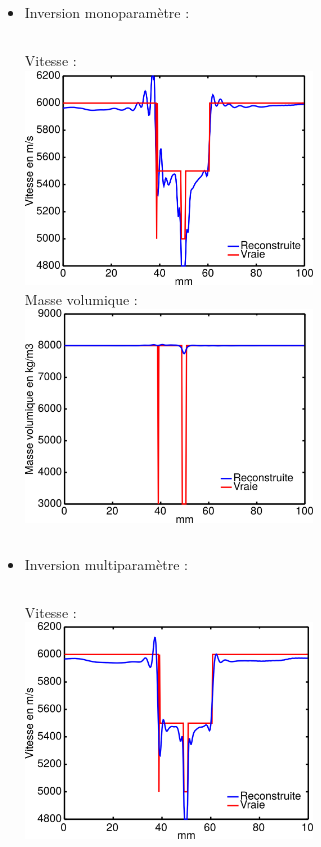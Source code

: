 \documentclass[10pt,xcolor=x11names,compress, notes=show]{beamer}%
\begin{document}
\subsection*{}
\begin{frame}{\insertsectionhead}
\begin{small}
\begin{itemize}
	\item Inversion monoparamètre : \\[0.2cm]
	\begin{columns}
		\centering
		Vitesse : \\[0.2cm]
		\includegraphics[width=0.6\textwidth]{img/multi/coupe_vp_mono_smooth_hor.png}\\
		\centering
		Masse volumique  : \\[0.2cm]
		\includegraphics[width=0.6\textwidth]{img/multi/coupe_rho_mono.png}\\
	\end{columns}
	\item Inversion multiparamètre : \\[0.2cm]
	\begin{columns}
		\column{0.5\textwidth}
		\centering
		Vitesse : \\[0.2cm]
		\includegraphics[width=0.6\textwidth]{img/multi/coupe_vp_multi.png}\\

\end{columns}
\end{itemize}
\end{small}
\end{frame}
\end{document}
